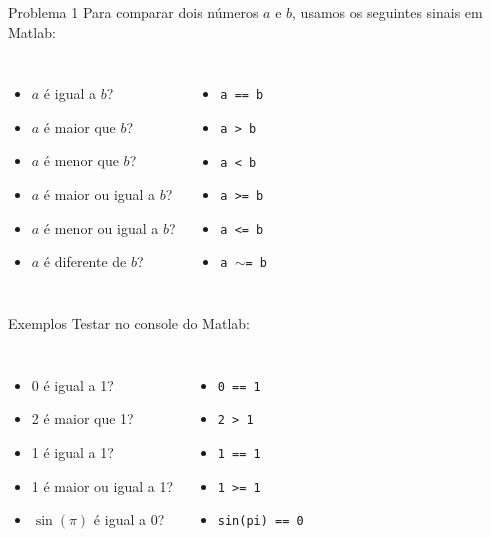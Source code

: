 \documentclass[hyperref={pdfpagelabels=false}]{beamer}
\begin{document}
\begin{frame}{Problema 1}
  Para comparar dois números $a$ e $b$, usamos os seguintes sinais em Matlab:
  \begin{columns}
    \column{5cm} 
    \begin{itemize}
    \item $a$ é igual a $b$? 
    \item $a$ é maior que $b$?
    \item $a$ é menor que $b$?
    \item $a$ é maior ou igual a $b$?
    \item $a$ é menor ou igual a $b$?
    \item $a$ é diferente de $b$?
    \end{itemize}
    \column{5cm}
    \begin{itemize}
    \item[] {\texttt{a == b}}
    \item[] {\texttt{a > b}}
    \item[] {\texttt{a < b}}
    \item[] {\texttt{a >= b}}
    \item[] {\texttt{a <= b}}
    \item[] {\texttt{a $\sim$= b}}
    \end{itemize}
  \end{columns}
\end{frame}

\begin{frame}{Exemplos}
  Testar no console do Matlab:
  \begin{columns}
    \column{5cm}
    \begin{itemize}	
    \item 0 é igual a 1?
    \item 2 é maior que 1?
    \item 1 é igual a 1?
    \item 1 é maior ou igual a 1?
    \item $\sin{(\pi)}$ é igual a 0?
    \end{itemize}
    \column{5cm}
    \begin{itemize}
    \item<2-> \texttt{0 == 1}
    \item<3-> \texttt{2 > 1}
    \item<4-> \texttt{1 == 1}
    \item<5-> \texttt{1 >= 1}
    \item<6-> \texttt{sin(pi) == 0}
    \end{itemize}
  \end{columns}
\end{frame}
\end{document}
